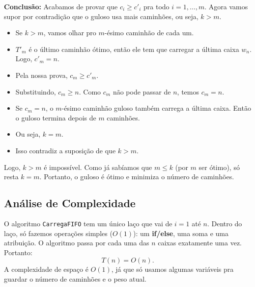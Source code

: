 \documentclass[a4paper,12pt]{article}
\begin{document}
\textbf{Conclusão:}
Acabamos de provar que $c_i \ge c'_i$ pra todo $i = 1, \dots, m$.
Agora vamos supor por contradição que o guloso usa mais caminhões, ou seja, $k > m$.
\begin{itemize}
    \item Se $k > m$, vamos olhar pro $m$-ésimo caminhão de cada um.
    \item $T'_m$ é o último caminhão ótimo, então ele tem que carregar a última caixa $w_n$. Logo, $c'_m = n$.
    \item Pela nossa prova, $c_m \ge c'_m$.
    \item Substituindo, $c_m \ge n$. Como $c_m$ não pode passar de $n$, temos $c_m = n$.
    \item Se $c_m = n$, o $m$-ésimo caminhão guloso também carrega a última caixa. Então o guloso termina depois de $m$ caminhões.
    \item Ou seja, $k=m$.
    \item Isso contradiz a suposição de que $k > m$.
\end{itemize}
Logo, $k > m$ é impossível. Como já sabíamos que $m \le k$ (por $m$ ser ótimo), só resta $k=m$. Portanto, o guloso é ótimo e minimiza o número de caminhões.

\subsection*{Análise de Complexidade}
O algoritmo \texttt{CarregaFIFO} tem um único laço que vai de $i=1$ até $n$.
Dentro do laço, só fazemos operações simples ($O(1)$): um \textbf{if/else}, uma soma e uma atribuição.
O algoritmo passa por cada uma das $n$ caixas exatamente uma vez.
Portanto:
\begin{equation}
\boxed{T(n) = O(n)}.
\end{equation}
A complexidade de espaço é $O(1)$, já que só usamos algumas variáveis pra guardar o número de caminhões e o peso atual.
\end{document}
